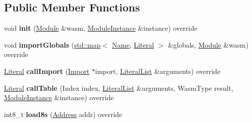 \subsection*{Public Member Functions}
\begin{DoxyCompactItemize}
\item 
\mbox{\label{structwasm_1_1_shell_external_interface_af9b4ecc2cf48afcc61ab6d7c0def2446}} 
void {\bfseries init} (\mbox{\hyperlink{classwasm_1_1_module}{Module}} \&wasm, \mbox{\hyperlink{classwasm_1_1_module_instance}{Module\+Instance}} \&instance) override
\item 
\mbox{\label{structwasm_1_1_shell_external_interface_a74a423894336788a2b720951b181aac0}} 
void {\bfseries import\+Globals} (\mbox{\hyperlink{classstd_1_1map}{std\+::map}}$<$ \mbox{\hyperlink{structwasm_1_1_name}{Name}}, \mbox{\hyperlink{classwasm_1_1_literal}{Literal}} $>$ \&globals, \mbox{\hyperlink{classwasm_1_1_module}{Module}} \&wasm) override
\item 
\mbox{\label{structwasm_1_1_shell_external_interface_a1ec7d14c1532df108ba12300f39307ae}} 
\mbox{\hyperlink{classwasm_1_1_literal}{Literal}} {\bfseries call\+Import} (\mbox{\hyperlink{classwasm_1_1_import}{Import}} $\ast$import, \mbox{\hyperlink{classstd_1_1vector}{Literal\+List}} \&arguments) override
\item 
\mbox{\label{structwasm_1_1_shell_external_interface_a27d0aeb9dcf690570a493e0aca8eb14a}} 
\mbox{\hyperlink{classwasm_1_1_literal}{Literal}} {\bfseries call\+Table} (Index index, \mbox{\hyperlink{classstd_1_1vector}{Literal\+List}} \&arguments, Wasm\+Type result, \mbox{\hyperlink{classwasm_1_1_module_instance}{Module\+Instance}} \&instance) override
\item 
\mbox{\label{structwasm_1_1_shell_external_interface_a891232e16a1b7502b08674c6338e14fd}} 
int8\+\_\+t {\bfseries load8s} (\mbox{\hyperlink{structwasm_1_1_address}{Address}} addr) override
\item 
\mbox{\label{structwasm_1_1_shell_external_interface_abe7c5720848f90469cf2d95ee7745308}} 

\end{DoxyCompactItemize}
